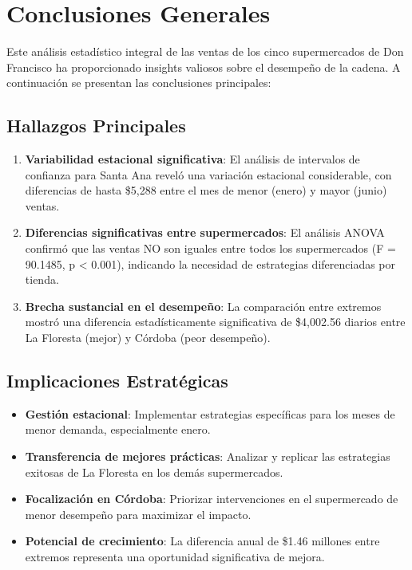 \documentclass[11pt,a4paper]{article}
\begin{document}
\section{Conclusiones Generales}

Este análisis estadístico integral de las ventas de los cinco supermercados de Don Francisco ha proporcionado insights valiosos sobre el desempeño de la cadena. A continuación se presentan las conclusiones principales:

\subsection{Hallazgos Principales}

\begin{enumerate}
    \item \textbf{Variabilidad estacional significativa}: El análisis de intervalos de confianza para Santa Ana reveló una variación estacional considerable, con diferencias de hasta \$5,288 entre el mes de menor (enero) y mayor (junio) ventas.
    
    \item \textbf{Diferencias significativas entre supermercados}: El análisis ANOVA confirmó que las ventas NO son iguales entre todos los supermercados (F = 90.1485, p < 0.001), indicando la necesidad de estrategias diferenciadas por tienda.
    
    \item \textbf{Brecha sustancial en el desempeño}: La comparación entre extremos mostró una diferencia estadísticamente significativa de \$4,002.56 diarios entre La Floresta (mejor) y Córdoba (peor desempeño).
\end{enumerate}

\subsection{Implicaciones Estratégicas}

\begin{itemize}
    \item \textbf{Gestión estacional}: Implementar estrategias específicas para los meses de menor demanda, especialmente enero.
    \item \textbf{Transferencia de mejores prácticas}: Analizar y replicar las estrategias exitosas de La Floresta en los demás supermercados.
    \item \textbf{Focalización en Córdoba}: Priorizar intervenciones en el supermercado de menor desempeño para maximizar el impacto.
    \item \textbf{Potencial de crecimiento}: La diferencia anual de \$1.46 millones entre extremos representa una oportunidad significativa de mejora.
\end{itemize}
\end{document}
